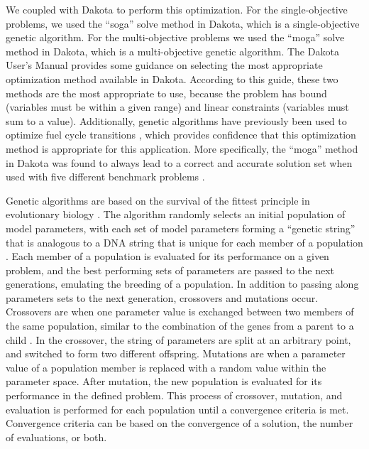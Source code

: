 We coupled \Cyclus \cite{huff_fundamental_2016} with Dakota 
\cite{adams_dakota_2021} to perform this optimization. For the 
single-objective problems, we used the ``soga'' solve method in 
Dakota, which is a single-objective genetic algorithm. For the 
multi-objective problems we used the ``moga'' solve method in 
Dakota, which is a multi-objective genetic algorithm. The Dakota 
User's Manual \cite{adams_dakota_2021} provides some guidance 
on selecting the most appropriate optimization method available 
in Dakota. According to this guide, these two methods are the most 
appropriate to use, because the problem has bound (variables 
must be within a given range) and linear constraints (variables must 
sum to a value). Additionally, genetic algorithms
have previously been used to optimize fuel cycle transitions 
\cite{passerini_systematic_2014}, which provides confidence that 
this optimization method is appropriate for this application. 
More specifically, the ``moga'' method 
in Dakota was found to always lead to a correct and accurate solution set 
when used with five different benchmark problems \cite{chiandussi_comparison_2012}.


Genetic algorithms are based on the survival of the fittest principle in 
evolutionary biology \cite{adams_dakota_2021}. The algorithm randomly 
selects an initial population of model parameters, with each set of model 
parameters forming a ``genetic string'' that is analogous to a DNA string 
that is unique for each member of a population \cite{adams_dakota_2021}.
Each member of a population is evaluated for its performance on a given 
problem, and the best performing sets of parameters are passed to the next 
generations, emulating the breeding of a population. In addition to 
passing along parameters sets to the next generation, crossovers and 
mutations occur. Crossovers are when one parameter value is exchanged 
between two members of the same population, similar to the combination of 
the genes from a parent to a child \cite{kramer_genetic_2017}. In 
the crossover, the string of parameters are split at an arbitrary point, and 
switched to form two different offspring.
Mutations are when a parameter 
value of a population member is replaced with a random value within the 
parameter space. After mutation, the new population is evaluated for 
its performance in the defined problem. This process of 
crossover, mutation, and evaluation is performed for each population 
until a convergence criteria is met. Convergence criteria can be based on 
the convergence of a solution, the number of evaluations, or both. 

